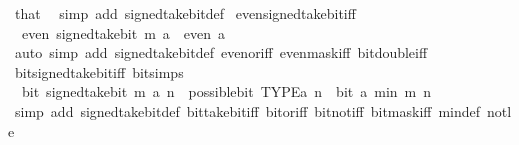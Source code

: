 \begin{isabellebody}
%
\isatagproof
{}\isamarkupfalse%
\ that\ \isamarkupfalse%
\ {\isacharparenleft}{\kern0pt}simp\ add{\isacharcolon}{\kern0pt}\ signed{\isacharunderscore}{\kern0pt}take{\isacharunderscore}{\kern0pt}bit{\isacharunderscore}{\kern0pt}def{\isacharparenright}{\kern0pt}%
\endisatagproof
{\isafoldproof}%
%
\isadelimproof
\isanewline
%
\endisadelimproof
\isanewline
{}\isamarkupfalse%
\ even{\isacharunderscore}{\kern0pt}signed{\isacharunderscore}{\kern0pt}take{\isacharunderscore}{\kern0pt}bit{\isacharunderscore}{\kern0pt}iff{\isacharcolon}{\kern0pt}\isanewline
\ \ {\isacartoucheopen}even\ {\isacharparenleft}{\kern0pt}signed{\isacharunderscore}{\kern0pt}take{\isacharunderscore}{\kern0pt}bit\ m\ a{\isacharparenright}{\kern0pt}\ {\isasymlongleftrightarrow}\ even\ a{\isacartoucheclose}\isanewline
%
\isadelimproof
\ \ %
\endisadelimproof
%
\isatagproof
{}\isamarkupfalse%
\ {\isacharparenleft}{\kern0pt}auto\ simp\ add{\isacharcolon}{\kern0pt}\ signed{\isacharunderscore}{\kern0pt}take{\isacharunderscore}{\kern0pt}bit{\isacharunderscore}{\kern0pt}def\ even{\isacharunderscore}{\kern0pt}or{\isacharunderscore}{\kern0pt}iff\ even{\isacharunderscore}{\kern0pt}mask{\isacharunderscore}{\kern0pt}iff\ bit{\isacharunderscore}{\kern0pt}double{\isacharunderscore}{\kern0pt}iff{\isacharparenright}{\kern0pt}%
\endisatagproof
{\isafoldproof}%
%
\isadelimproof
\isanewline
%
\endisadelimproof
\isanewline
{}\isamarkupfalse%
\ bit{\isacharunderscore}{\kern0pt}signed{\isacharunderscore}{\kern0pt}take{\isacharunderscore}{\kern0pt}bit{\isacharunderscore}{\kern0pt}iff\ {\isacharbrackleft}{\kern0pt}bit{\isacharunderscore}{\kern0pt}simps{\isacharbrackright}{\kern0pt}{\isacharcolon}{\kern0pt}\isanewline
\ \ {\isacartoucheopen}bit\ {\isacharparenleft}{\kern0pt}signed{\isacharunderscore}{\kern0pt}take{\isacharunderscore}{\kern0pt}bit\ m\ a{\isacharparenright}{\kern0pt}\ n\ {\isasymlongleftrightarrow}\ possible{\isacharunderscore}{\kern0pt}bit\ TYPE{\isacharparenleft}{\kern0pt}{\isacharprime}{\kern0pt}a{\isacharparenright}{\kern0pt}\ n\ {\isasymand}\ bit\ a\ {\isacharparenleft}{\kern0pt}min\ m\ n{\isacharparenright}{\kern0pt}{\isacartoucheclose}\isanewline
%
\isadelimproof
\ \ %
\endisadelimproof
%
\isatagproof
{}\isamarkupfalse%
\ {\isacharparenleft}{\kern0pt}simp\ add{\isacharcolon}{\kern0pt}\ signed{\isacharunderscore}{\kern0pt}take{\isacharunderscore}{\kern0pt}bit{\isacharunderscore}{\kern0pt}def\ bit{\isacharunderscore}{\kern0pt}take{\isacharunderscore}{\kern0pt}bit{\isacharunderscore}{\kern0pt}iff\ bit{\isacharunderscore}{\kern0pt}or{\isacharunderscore}{\kern0pt}iff\ bit{\isacharunderscore}{\kern0pt}not{\isacharunderscore}{\kern0pt}iff\ bit{\isacharunderscore}{\kern0pt}mask{\isacharunderscore}{\kern0pt}iff\ min{\isacharunderscore}{\kern0pt}def\ not{\isacharunderscore}{\kern0pt}le{\isacharparenright}{\kern0pt}\isanewline

\end{isabellebody}
